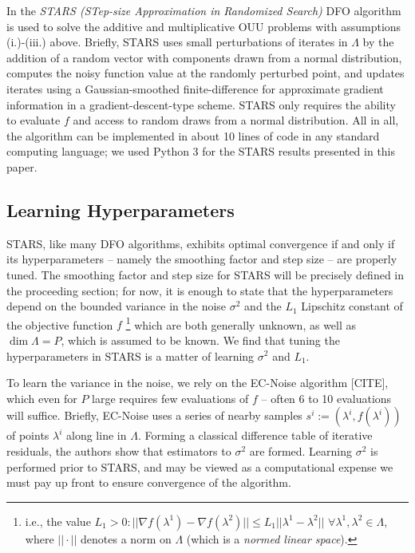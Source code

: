 \documentclass{amsart}
\begin{document}
In \cite{CW} the \textit{STARS (STep-size Approximation in Randomized Search)} DFO algorithm is used to solve the additive and multiplicative OUU problems with assumptions (i.)-(iii.) above. Briefly, STARS uses small perturbations of iterates in $\Lambda$ by the addition of a random vector with components drawn from a normal distribution, computes the noisy function value at the randomly perturbed point, and updates iterates using a Gaussian-smoothed finite-difference for approximate gradient information in a gradient-descent-type scheme. STARS only  requires the ability to evaluate $f$ and access to random draws from a normal distribution. All in all, the algorithm can be implemented in about 10 lines of code in any standard computing language; we used Python 3 for the STARS results presented in this paper. 


\subsection{Learning Hyperparameters} 
STARS, like many DFO algorithms, exhibits optimal convergence if and only if its hyperparameters -- namely the smoothing factor and step size -- are properly tuned. The smoothing factor and step size for STARS will be precisely defined in the proceeding section; for now, it is enough to state that the hyperparameters depend on the bounded variance in the noise $\sigma^2$ and the $L_1$ Lipschitz constant of the objective function $f$ 
\footnote{i.e., the value $L_1> 0: ||\nabla f(\lambda^1)-\nabla f(\lambda^2)|| \leq L_1 ||\lambda^1 -\lambda^2||$ $\forall \lambda^1, \lambda^2 \in \Lambda$, where $||\cdot||$ denotes a norm on $\Lambda$ (which is a \textit{normed linear space}).}
which are both generally unknown, as well as $\dim \Lambda=P$, which is assumed to be known. We find that tuning the hyperparameters in STARS is a matter of learning $\sigma^2$ and $L_1$.

To learn the variance in the noise, we rely on the EC-Noise algorithm [CITE], which even for $P$ large requires few evaluations of $f$ -- often 6 to 10 evaluations will suffice. Briefly, EC-Noise uses a series of nearby samples $s^i:=(\lambda^i,f(\lambda^i))$ of points $\lambda^i$ along line in $\Lambda$. Forming a classical difference table of iterative residuals, the authors show that estimators to $\sigma^2$ are formed. Learning $\sigma^2$ is performed prior to STARS, and may be viewed as a computational expense we must pay up front to ensure convergence of the algorithm.
\end{document}
